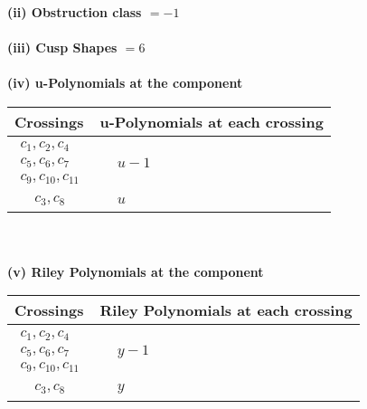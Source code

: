 \documentclass[1p]{elsarticle_modified}
\theoremstyle{definition}
\begin{document}
\flushleft \textbf{(ii) Obstruction class $= -1$}\\~\\
\flushleft \textbf{(iii) Cusp Shapes $= 6$}\\~\\
\newpage\renewcommand{\arraystretch}{1}
\flushleft \textbf{(iv) u-Polynomials at the component}\newline \\
\begin{tabular}{m{50pt}|m{274pt}}
Crossings & \hspace{64pt}u-Polynomials at each crossing \\
\hline $$\begin{aligned}c_{1},c_{2},c_{4}\\c_{5},c_{6},c_{7}\\c_{9},c_{10},c_{11}\end{aligned}$$&$\begin{aligned}
&u-1
\end{aligned}$\\
\hline $$\begin{aligned}c_{3},c_{8}\end{aligned}$$&$\begin{aligned}
&u
\end{aligned}$\\
\hline
\end{tabular}\\~\\
\newpage\renewcommand{\arraystretch}{1}
\flushleft \textbf{(v) Riley Polynomials at the component}\newline \\
\begin{tabular}{m{50pt}|m{274pt}}
Crossings & \hspace{64pt}Riley Polynomials at each crossing \\
\hline $$\begin{aligned}c_{1},c_{2},c_{4}\\c_{5},c_{6},c_{7}\\c_{9},c_{10},c_{11}\end{aligned}$$&$\begin{aligned}
&y-1
\end{aligned}$\\
\hline $$\begin{aligned}c_{3},c_{8}\end{aligned}$$&$\begin{aligned}
&y
\end{aligned}$\\
\hline
\end{tabular}\\~\\
\end{document}
